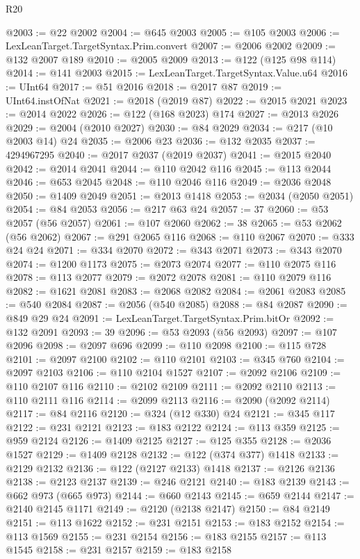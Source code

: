 \begin{lexlean}{R20}
\begin{coremodule}
@2003 := @22 @2002
@2004 := @645 @2003
@2005 := @105 @2003
@2006 := LexLeanTarget.TargetSyntax.Prim.convert
@2007 := @2006 @2002
@2009 := @132 @2007 @189
@2010 := @2005 @2009
@2013 := @122 (@125 @98 @114)
@2014 := @141 @2003
@2015 := LexLeanTarget.TargetSyntax.Value.u64
@2016 := UInt64
@2017 := @51 @2016
@2018 := @2017 @87
@2019 := UInt64.instOfNat
@2021 := @2018 (@2019 @87)
@2022 := @2015 @2021
@2023 := @2014 @2022
@2026 := @122 (@168 @2023) @174
@2027 := @2013 @2026
@2029 := @2004 (@2010 @2027)
@2030 := @84 @2029
@2034 := @217 (@10 @2003 @14) @24
@2035 := @2006 @23
@2036 := @132 @2035
@2037 := 4294967295
@2040 := @2017 @2037 (@2019 @2037)
@2041 := @2015 @2040
@2042 := @2014 @2041
@2044 := @110 @2042 @116
@2045 := @113 @2044
@2046 := @653 @2045
@2048 := @110 @2046 @116
@2049 := @2036 @2048
@2050 := @1409 @2049
@2051 := @2013 @1418
@2053 := @2034 (@2050 @2051)
@2054 := @84 @2053
@2056 := @217 @63 @24
@2057 := 37
@2060 := @53 @2057 (@56 @2057)
@2061 := @107 @2060
@2062 := 38
@2065 := @53 @2062 (@56 @2062)
@2067 := @291 @2065 @116
@2068 := @110 @2067
@2070 := @333 @24 @24
@2071 := @334 @2070
@2072 := @343 @2071
@2073 := @343 @2070
@2074 := @1200 @1173
@2075 := @2073 @2074
@2077 := @110 @2075 @116
@2078 := @113 @2077
@2079 := @2072 @2078
@2081 := @110 @2079 @116
@2082 := @1621 @2081
@2083 := @2068 @2082
@2084 := @2061 @2083
@2085 := @540 @2084
@2087 := @2056 (@540 @2085)
@2088 := @84 @2087
@2090 := @849 @29 @24
@2091 := LexLeanTarget.TargetSyntax.Prim.bitOr
@2092 := @132 @2091
@2093 := 39
@2096 := @53 @2093 (@56 @2093)
@2097 := @107 @2096
@2098 := @2097 @696
@2099 := @110 @2098
@2100 := @115 @728
@2101 := @2097 @2100
@2102 := @110 @2101
@2103 := @345 @760
@2104 := @2097 @2103
@2106 := @110 @2104 @1527
@2107 := @2092 @2106
@2109 := @110 @2107 @116
@2110 := @2102 @2109
@2111 := @2092 @2110
@2113 := @110 @2111 @116
@2114 := @2099 @2113
@2116 := @2090 (@2092 @2114)
@2117 := @84 @2116
@2120 := @324 (@12 @330) @24
@2121 := @345 @117
@2122 := @231 @2121
@2123 := @183 @2122
@2124 := @113 @359
@2125 := @959 @2124
@2126 := @1409 @2125
@2127 := @125 @355
@2128 := @2036 @1527
@2129 := @1409 @2128
@2132 := @122 (@374 @377) @1418
@2133 := @2129 @2132
@2136 := @122 (@2127 @2133) @1418
@2137 := @2126 @2136
@2138 := @2123 @2137
@2139 := @246 @2121
@2140 := @183 @2139
@2143 := @662 @973 (@665 @973)
@2144 := @660 @2143
@2145 := @659 @2144
@2147 := @2140 @2145 @1171
@2149 := @2120 (@2138 @2147)
@2150 := @84 @2149
@2151 := @113 @1622
@2152 := @231 @2151
@2153 := @183 @2152
@2154 := @113 @1569
@2155 := @231 @2154
@2156 := @183 @2155
@2157 := @113 @1545
@2158 := @231 @2157
@2159 := @183 @2158

\end{coremodule}
\end{lexlean}
